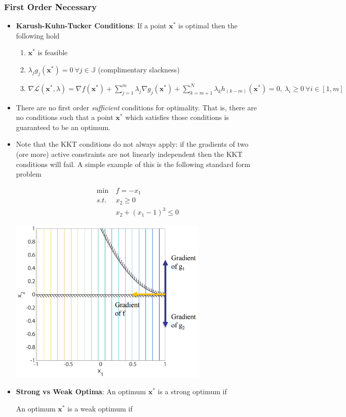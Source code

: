 \documentclass[11pt]{article}
\newcommand{\Item}[1]{\item \textbf{#1}:}
\newcommand{\CenteredBoxed}[1]{\begin{center}\boxed{#1}\end{center}}
\newcommand{\sumlim}[2]{\sum\limits_{#1}^{#2}}
\newcommand{\boldx}{\mathbf{x}}
\newcommand{\xstar}{\boldx^*}
\begin{document}
\subsubsection{First Order Necessary}
\begin{itemize}
\Item{Karush-Kuhn-Tucker Conditions} If a point $\xstar$ is optimal then the following hold
	\begin{enumerate}
	\item $\xstar$ is feasible
	\item $\lambda_jg_j(\xstar)=0\ \forall j\in\mathbb{J}$ (complimentary slackness)
	\item $\nabla\mathcal{L}(\xstar,\lambda)=\nabla f(\xstar)+\sumlim{j=1}{m}\lambda_j\nabla g_j(\xstar)+\sumlim{k=m+1}{\mathcal{N}}\lambda_kh_{(k-m)}(\xstar)=0,\ \lambda_i\geq0\ \forall i\in[1,m]$
	\end{enumerate}
\item There are no first order \emph{sufficient} conditions for optimality. That is, there are no conditions such that a point $\xstar$ which satisfies those conditions is guaranteed to be an optimum.
\item Note that the KKT conditions do not always apply: if the gradients of two (ore more) active constraints are not linearly independent then the KKT conditions will fail. A simple example of this is the following standard form problem

\begin{minipage}{0.48\textwidth}
\begin{align*}
\min\ &f=-x_1\\
s.t.\ &x_2\geq0\\
&x_2+(x_1-1)^3\leq0
\end{align*}
\end{minipage}
\begin{minipage}{0.48\textwidth}
\includegraphics[width=0.75\textwidth]{Graphics/KKT_failure.PNG}
\end{minipage}

\Item{Strong vs Weak Optima} An optimum $\xstar$ is a strong optimum if
\CenteredBoxed{\xstar<\boldx\ \forall \boldx\in[\xstar-\varepsilon,\xstar+\varepsilon]}
An optimum $\xstar$ is a weak optimum if
\CenteredBoxed{\xstar\leq \boldx\ \forall \boldx\in[\xstar-\varepsilon,\xstar+\varepsilon]}
\end{itemize}
\end{document}

